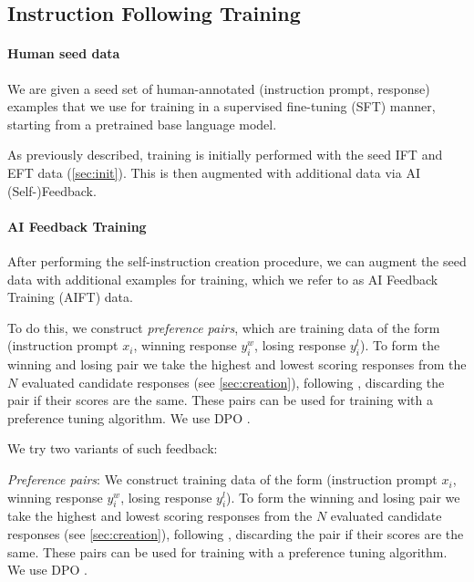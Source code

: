 \documentclass{article}
\begin{document}
\subsection{Instruction Following Training}

\paragraph{Human seed data} We are given a seed set of human-annotated 
(instruction prompt, response) examples
that we use for training in a supervised fine-tuning (SFT) manner, starting from a pretrained base language model. 
\fi 

As previously described, training is initially performed with the seed IFT and EFT data (\autoref{sec:init}). 
This is then augmented with additional data via AI (Self-)Feedback. 

\paragraph{AI Feedback Training}
After performing the self-instruction creation procedure, we can 
augment the  seed data with  additional examples for training, which we refer to as
AI Feedback Training (AIFT) data. 

To do this, we construct {\em preference pairs}, which are training data of the form (instruction prompt $x_i$, winning response $y_i^w$, losing response $y_i^l$).  To form the winning and losing pair we take the highest and lowest scoring responses from the $N$ evaluated candidate responses (see \autoref{sec:creation}), following \citet{xu2023some}, discarding the pair if their scores are the same. These pairs can be used for training with a preference tuning algorithm. We use DPO \citep{rafailov2023direct}. 

We try two variants of such feedback:

{\em Preference pairs}: We construct training data of the form (instruction prompt $x_i$, winning response $y_i^w$, losing response $y_i^l$).  To form the winning and losing pair we take the highest and lowest scoring responses from the $N$ evaluated candidate responses (see \autoref{sec:creation}), following \citet{xu2023some}, discarding the pair if their scores are the same. These pairs can be used for training with a preference tuning algorithm. We use DPO \citep{rafailov2023direct}.
\end{document}
